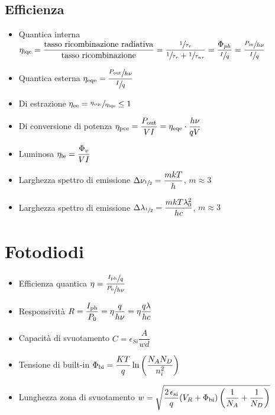 \documentclass{article}
\begin{document}
\subsection{Efficienza}
\begin{itemize}
  \item Quantica interna \( \eta_{\textnormal{iqe}} = \dfrac{\textnormal{tasso ricombinazione radiativa}}{\textnormal{tasso ricombinazione}} = \dfrac{\sfrac{1}{\tau_r}}{\sfrac{1}{\tau_r} + \sfrac{1}{\tau_{nr}}} = \dfrac{\Phi_{ph}}{\sfrac{I}{q}} = \dfrac{\sfrac{P_{\textnormal{in}}}{h \nu}}{\sfrac{I}{q}}\)
  \item Quantica esterna \( \eta_{\textnormal{eqe}} = \dfrac{\sfrac{P_{\textnormal{out}}}{h \nu}}{\sfrac{I}{q}}\)
  \item Di estrazione \( \eta_{\textnormal{ee}} = \sfrac{ \eta_{\textnormal{eqe}}}{\eta_{\textnormal{iqe}}} \leq 1 \)
  \item Di conversione di potenza \( \eta_{\textnormal{pce}} = \dfrac{P_{\textnormal{out}}}{V I} = \eta_{\textnormal{eqe}} \cdot \dfrac{h \nu}{q V}\)
  \item Luminosa \( \eta_{\textnormal{le}} = \dfrac{\Phi_v}{V I} \)
  \item Larghezza spettro di emissione \( \Delta \nu_{\sfrac{1}{2}} = \dfrac{m k T}{h} \), \(m \approx 3 \)
  \item Larghezza spettro di emissione \( \Delta \lambda_{\sfrac{1}{2}} = \dfrac{m k T \lambda_0^2}{h c} \), \(m \approx 3 \)
\end{itemize}

\newpage

\section{Fotodiodi}
\begin{itemize}
  \item Efficienza quantica \( \eta = \dfrac{\sfrac{I_{\textnormal{ph}}}{q}}{\sfrac{P_0}{h \nu}} \)
  \item Responsività \( R = \dfrac{I_{\textnormal{ph}}}{P_0} = \eta \dfrac{q}{h \nu} = \eta \dfrac{q \lambda}{h c} \)
  \item Capacità di svuotamento \( C = \epsilon_{Si} \dfrac{A}{w d} \)
  \item Tensione di built-in \( \Phi_{\textnormal{bi}} = \dfrac{KT}{q} \ln\left( \dfrac{N_A N_D}{n_i^ 2}\right) \)
  \item Lunghezza zona di svuotamento \( w = \sqrt{ \dfrac{2 \, \epsilon_{\textnormal{si}}}{q} (V_R +  \Phi_{\textnormal{bi}}) \left( \dfrac{1}{N_A} + \dfrac{1}{N_D} \right) } \)
\end{itemize}
\end{document}
